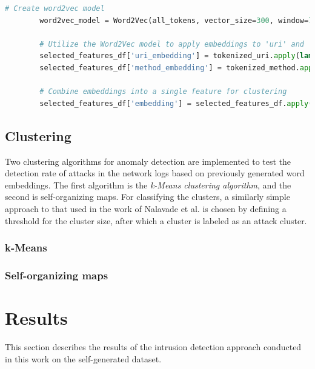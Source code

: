 \documentclass[
    fontsize=12pt,
    headings=small,
    parskip=half,           %
    bibliography=totoc,
    numbers=noenddot,       %
    open=any,               %
    ]{scrreprt}
\begin{document}
\begin{minipage}\linewidth
	\begin{lstlisting}[language={python}, caption={Creation of Word2Vec model and word embeddings}, label={lst:word2vec}] 
		# Create word2vec model
		word2vec_model = Word2Vec(all_tokens, vector_size=300, window=7, min_count=1, workers=4)
		
		# Utilize the Word2Vec model to apply embeddings to 'uri' and 'method' values
		selected_features_df['uri_embedding'] = tokenized_uri.apply(lambda x: sum(word2vec_model.wv[t] for t in x))
		selected_features_df['method_embedding'] = tokenized_method.apply(lambda x: sum(word2vec_model.wv[t] for t in x))
		
		# Combine embeddings into a single feature for clustering
		selected_features_df['embedding'] = selected_features_df.apply(lambda row: row['uri_embedding'] + row['method_embedding'], axis=1)
	\end{lstlisting}
\end{minipage}

\subsection{Clustering}
Two clustering algorithms for anomaly detection are implemented to test the detection rate of attacks in the network logs based on previously generated word embeddings. The first algorithm is the \emph{k-Means clustering algorithm}, and the second is self-organizing maps. For classifying the clusters, a similarly simple approach to that used in the work of Nalavade et al. \cite{nalavade2014} is chosen by defining a threshold for the cluster size, after which a cluster is labeled as an attack cluster.

\subsubsection{k-Means}

\subsubsection{Self-organizing maps}

\section{Results}
This section describes the results of the intrusion detection approach conducted in this work on the self-generated dataset.
\end{document}
